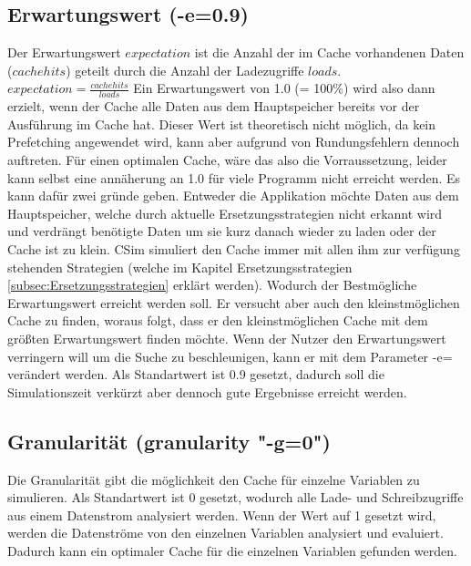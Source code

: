 \documentclass{scrreprt}
\begin{document}
\subsection{Erwartungswert (-e=0.9)}

Der Erwartungswert \(expectation\) ist die Anzahl der im Cache vorhandenen Daten (\(cachehits\)) geteilt durch die Anzahl der Ladezugriffe \(loads\).
\(expectation = \frac{cache hits}{loads}\)
\newline
Ein Erwartungswert von 1.0 (= 100\%) wird also dann erzielt, wenn der Cache alle Daten aus dem Hauptspeicher bereits vor der Ausführung im Cache hat. Dieser Wert ist theoretisch nicht möglich, da kein Prefetching angewendet wird, kann aber aufgrund von Rundungsfehlern dennoch auftreten. Für einen optimalen Cache, wäre das also die Vorraussetzung, leider kann selbst eine annäherung an 1.0 für viele Programm nicht erreicht werden. Es kann dafür zwei gründe geben. Entweder die Applikation möchte Daten aus dem Hauptspeicher, welche durch aktuelle Ersetzungsstrategien nicht erkannt wird und verdrängt benötigte Daten um sie kurz danach wieder zu laden oder der Cache ist zu klein. CSim simuliert den Cache immer mit allen ihm zur verfügung stehenden Strategien (welche im Kapitel Ersetzungsstrategien \ref{subsec:Ersetzungsstrategien} erklärt werden). Wodurch der Bestmögliche Erwartungswert erreicht werden soll. Er versucht aber auch den kleinstmöglichen Cache zu finden, woraus folgt, dass er den kleinstmöglichen Cache mit dem größten Erwartungswert finden möchte. \newline
Wenn der Nutzer den Erwartungswert verringern will um die Suche zu beschleunigen, kann er mit dem Parameter -e= verändert werden. Als Standartwert ist 0.9 gesetzt, dadurch soll die Simulationszeit verkürzt aber dennoch gute Ergebnisse erreicht werden.

\subsection{Granularität (granularity "-g=0") }

Die Granularität gibt die möglichkeit den Cache für einzelne Variablen zu simulieren. Als Standartwert ist 0 gesetzt, wodurch alle Lade- und Schreibzugriffe aus einem Datenstrom analysiert werden.
Wenn der Wert auf 1 gesetzt wird, werden die Datenströme von den einzelnen Variablen analysiert und evaluiert. Dadurch kann ein optimaler Cache für die einzelnen Variablen gefunden werden.
\end{document}
